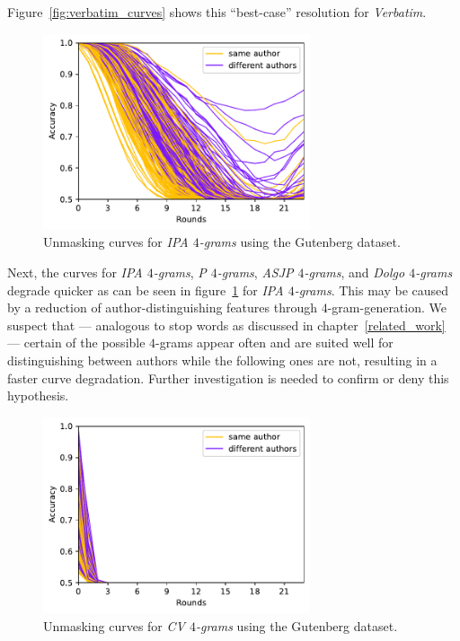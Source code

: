 Figure~\ref{fig:verbatim_curves} shows this ``best-case'' resolution for \textit{Verbatim}.
\begin{figure}
  \centering
  \includegraphics[width=0.7\textwidth]{figures/ipa_4grams_curves}
  \caption{Unmasking curves for \textit{IPA $4$-grams} using the Gutenberg dataset.}
  \label{fig:ipa_4grams_curves}
\end{figure}
Next, the curves for \textit{IPA $4$-grams}, \textit{P $4$-grams}, \textit{ASJP $4$-grams}, and \textit{Dolgo $4$-grams} degrade quicker as can be seen in figure~\ref{fig:ipa_4grams_curves} for \textit{IPA $4$-grams}.
This may be caused by a reduction of author-distinguishing features through $4$-gram-generation.
We suspect that --- analogous to stop words as discussed in chapter~\ref{related_work} --- certain of the possible $4$-grams appear often and are suited well for distinguishing between authors while the following ones are not, resulting in a faster curve degradation.
Further investigation is needed to confirm or deny this hypothesis.
\begin{figure}
  \centering
  \includegraphics[width=0.7\textwidth]{figures/cv_4grams_curves}
  \caption{Unmasking curves for \textit{CV $4$-grams} using the Gutenberg dataset.}
  \label{fig:cv_4grams_curves}
\end{figure}
